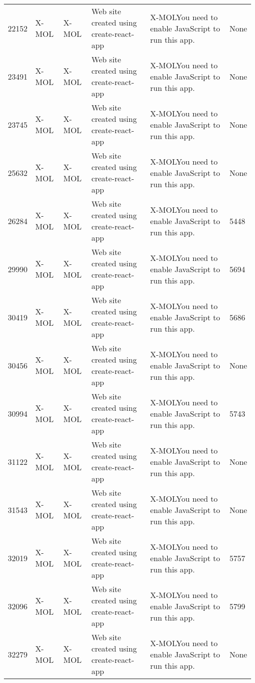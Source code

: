 \begin{landscape}
\begin{table}
{\begin{tabular}{llp{2cm}lll}
22152 & X-MOL              & X-MOL                & Web site created using create-react-app & X-MOLYou need to enable JavaScript to run this app. & None       \\
23491 & X-MOL              & X-MOL                & Web site created using create-react-app & X-MOLYou need to enable JavaScript to run this app. & None       \\
23745 & X-MOL              & X-MOL                & Web site created using create-react-app & X-MOLYou need to enable JavaScript to run this app. & None       \\
25632 & X-MOL              & X-MOL                & Web site created using create-react-app & X-MOLYou need to enable JavaScript to run this app. & None       \\
26284 & X-MOL              & X-MOL                & Web site created using create-react-app & X-MOLYou need to enable JavaScript to run this app. & 5448 \\
29990 & X-MOL              & X-MOL                & Web site created using create-react-app & X-MOLYou need to enable JavaScript to run this app. & 5694 \\
30419 & X-MOL              & X-MOL                & Web site created using create-react-app & X-MOLYou need to enable JavaScript to run this app. & 5686 \\
30456 & X-MOL              & X-MOL                & Web site created using create-react-app & X-MOLYou need to enable JavaScript to run this app. & None       \\
30994 & X-MOL              & X-MOL                & Web site created using create-react-app & X-MOLYou need to enable JavaScript to run this app. & 5743 \\
31122 & X-MOL              & X-MOL                & Web site created using create-react-app & X-MOLYou need to enable JavaScript to run this app. & None       \\
31543 & X-MOL              & X-MOL                & Web site created using create-react-app & X-MOLYou need to enable JavaScript to run this app. & None       \\
32019 & X-MOL              & X-MOL                & Web site created using create-react-app & X-MOLYou need to enable JavaScript to run this app. & 5757 \\
32096 & X-MOL              & X-MOL                & Web site created using create-react-app & X-MOLYou need to enable JavaScript to run this app. & 5799 \\
32279 & X-MOL              & X-MOL                & Web site created using create-react-app & X-MOLYou need to enable JavaScript to run this app. & None       \\

\end{tabular}}
\end{table}
\end{landscape}
